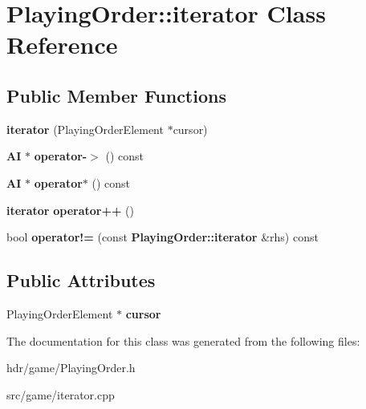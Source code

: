 \section{Playing\-Order\-:\-:iterator Class Reference}
\label{class_playing_order_1_1iterator}
\subsection*{Public Member Functions}
\begin{DoxyCompactItemize}
\item 
{\bfseries iterator} (Playing\-Order\-Element $\ast$cursor)\label{class_playing_order_1_1iterator_aa1acaaf5aa4cb04b45d688bdb2585cb7}

\item 
{\bf A\-I} $\ast$ {\bfseries operator-\/$>$} () const \label{class_playing_order_1_1iterator_ae273376a2c7a09cbad0ddc17a9120a57}

\item 
{\bf A\-I} $\ast$ {\bfseries operator$\ast$} () const \label{class_playing_order_1_1iterator_a766bf56248a6beb3a7515de7fe6e85f0}

\item 
{\bf iterator} {\bfseries operator++} ()\label{class_playing_order_1_1iterator_a53d94a59d257d705067a6631c11b31cc}

\item 
bool {\bfseries operator!=} (const {\bf Playing\-Order\-::iterator} \&rhs) const \label{class_playing_order_1_1iterator_aff6e658fd7eb13f7538bcd88efd66ad2}

\end{DoxyCompactItemize}
\subsection*{Public Attributes}
\begin{DoxyCompactItemize}
\item 
Playing\-Order\-Element $\ast$ {\bfseries cursor}\label{class_playing_order_1_1iterator_a8685cc1ee395f5b45ea6ec85c2110ebd}

\end{DoxyCompactItemize}


The documentation for this class was generated from the following files\-:\begin{DoxyCompactItemize}
\item 
hdr/game/Playing\-Order.\-h\item 
src/game/iterator.\-cpp\end{DoxyCompactItemize}
